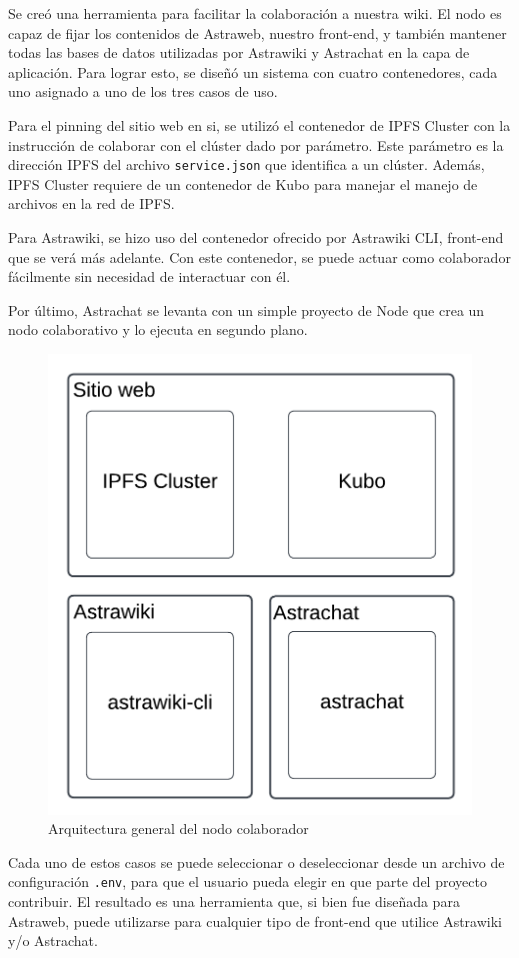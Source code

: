 Se creó una herramienta para facilitar la colaboración a nuestra wiki. El nodo es capaz de fijar los contenidos de Astraweb, nuestro front-end, y también mantener todas las bases de datos utilizadas por Astrawiki y Astrachat en la capa de aplicación. Para lograr esto, se diseñó un sistema con cuatro contenedores, cada uno asignado a uno de los tres casos de uso.

Para el pinning del sitio web en si, se utilizó el contenedor de IPFS Cluster con la instrucción de colaborar con el clúster dado por parámetro. Este parámetro es la dirección IPFS del archivo \texttt{service.json} que identifica a un clúster. Además, IPFS Cluster requiere de un contenedor de Kubo para manejar el manejo de archivos en la red de IPFS.

Para Astrawiki, se hizo uso del contenedor ofrecido por Astrawiki CLI, front-end que se verá más adelante. Con este contenedor, se puede actuar como colaborador fácilmente sin necesidad de interactuar con él.

Por último, Astrachat se levanta con un simple proyecto de Node que crea un nodo colaborativo y lo ejecuta en segundo plano.

\begin{figure}[H]
    \centering
    \includegraphics[width=0.5\linewidth]{img/solucion-ipfs/collaborator-arch.png}
    \caption{Arquitectura general del nodo colaborador}
    \label{fig:collaborator-architecture}
\end{figure}

Cada uno de estos casos se puede seleccionar o deseleccionar desde un archivo de configuración \texttt{.env}, para que el usuario pueda elegir en que parte del proyecto contribuir. El resultado es una herramienta que, si bien fue diseñada para Astraweb, puede utilizarse para cualquier tipo de front-end que utilice Astrawiki y/o Astrachat.